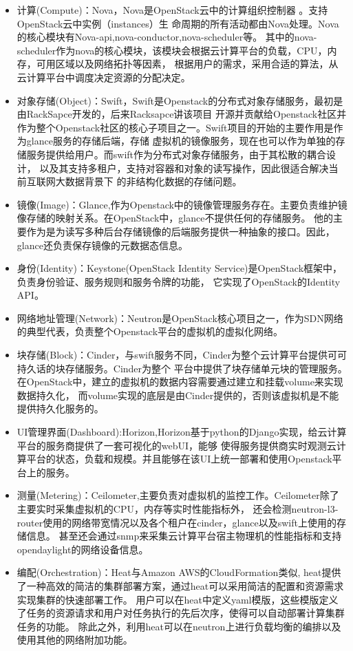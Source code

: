 \begin{itemize}
\item 计算(Compute)：Nova，Nova是OpenStack云中的计算组织控制器 。支持OpenStack云中实例（instances）生
命周期的所有活动都由Nova处理。Nova的核心模块有Nova-api,nova-conductor,nova-scheduler等。
其中的nova-scheduler作为nova的核心模块，该模块会根据云计算平台的负载，CPU，内存，可用区域以及网络拓扑等因素，
根据用户的需求，采用合适的算法，从云计算平台中调度决定资源的分配决定。
\item 对象存储(Object)：Swift，Swift是Openstack的分布式对象存储服务，最初是由RackSapce开发的，后来Racksapce讲该项目
开源并贡献给Openstack社区并作为整个Openstack社区的核心子项目之一。Swift项目的开始的主要作用是作为glance服务的存储后端，存储
虚拟机的镜像服务，现在也可以作为单独的存储服务提供给用户。而swift作为分布式对象存储服务，由于其松散的耦合设计，
以及其支持多租户，支持对容器和对象的读写操作，因此很适合解决当前互联网大数据背景下
的非结构化数据的存储问题。
\item 镜像(Image)：Glance,作为Openstack中的镜像管理服务存在。主要负责维护镜像存储的映射关系。在OpenStack中，glance不提供任何的存储服务。
他的主要作为是为读写多种后台存储镜像的后端服务提供一种抽象的接口。因此，glance还负责保存镜像的元数据态信息。
\item 身份(Identity)：Keystone(OpenStack Identity Service)是OpenStack框架中，负责身份验证、服务规则和服务令牌的功能， 它实现了OpenStack的Identity API。
\item 网络地址管理(Network)：Neutron是OpenStack核心项目之一，作为SDN网络的典型代表，负责整个Openstack平台的虚拟机的虚拟化网络。
\item 块存储(Block)：Cinder，与swift服务不同，Cinder为整个云计算平台提供可可持久话的块存储服务。Cinder为整个
平台中提供了块存储单元块的管理服务。在OpenStack中，建立的虚拟机的数据内容需要通过建立和挂载volume来实现数据持久化，
而volume实现的底层是由Cinder提供的，否则该虚拟机是不能提供持久化服务的。
\item UI管理界面(Dashboard):Horizon,Horizon基于python的Django实现，给云计算平台的服务商提供了一套可视化的webUI，能够
使得服务提供商实时观测云计算平台的状态，负载和规模。并且能够在该UI上统一部署和使用Openstack平台上的服务。
\item 测量(Metering)：Ceilometer,主要负责对虚拟机的监控工作。Ceilometer除了主要实时采集虚拟机的CPU，内存等实时性能指标外，
还会检测neutron-l3-router使用的网络带宽情况以及各个租户在cinder，glance以及swift上使用的存储信息。
甚至还会通过snmp来采集云计算平台宿主物理机的性能指标和支持opendaylight的网络设备信息。
\item 编配(Orchestration)：Heat与Amazon AWS的CloudFormation类似,
heat提供了一种高效的简洁的集群部署方案，通过heat可以采用简洁的配置和资源需求实现集群的快速部署工作。
用户可以在heat中定义yaml模版，这些模版定义了任务的资源请求和用户对任务执行的先后次序，使得可以自动部署计算集群任务的功能。
除此之外，利用heat可以在neutron上进行负载均衡的编排以及使用其他的网络附加功能。
\end{itemize}

